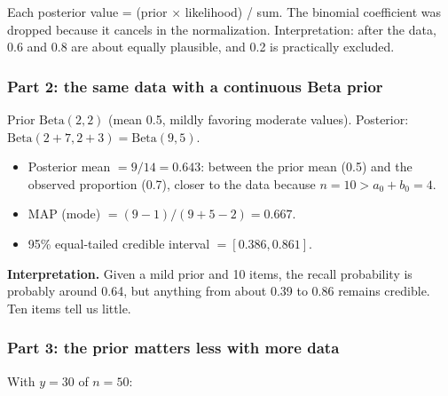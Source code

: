 Each posterior value = (prior × likelihood) / sum. The binomial
coefficient was dropped because it cancels in the normalization.
Interpretation: after the data, 0.6 and 0.8 are about equally plausible,
and 0.2 is practically excluded.

\subsubsection{Part 2: the same data with a continuous Beta prior}

Prior \(\mathrm{Beta}(2, 2)\) (mean 0.5, mildly favoring moderate
values). Posterior:
\(\mathrm{Beta}(2 + 7, 2 + 3) = \mathrm{Beta}(9, 5)\).

\begin{itemize}
\tightlist
\item
  Posterior mean \(= 9/14 = 0.643\): between the prior mean (0.5) and
  the observed proportion (0.7), closer to the data because
  \(n = 10 > a_0 + b_0 = 4\).
\item
  MAP (mode) \(= (9 - 1)/(9 + 5 - 2) = 0.667\).
\item
  95\% equal-tailed credible interval \(= [0.386, 0.861]\).
\end{itemize}

\textbf{Interpretation.} Given a mild prior and 10 items, the recall
probability is probably around 0.64, but anything from about 0.39 to
0.86 remains credible. Ten items tell us little.

\subsubsection{Part 3: the prior matters less with more data}

With \(y = 30\) of \(n = 50\):

